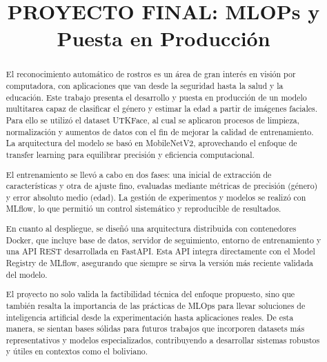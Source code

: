 \documentclass[sigplan,screen]{acmart}
\begin{document}
\begin{abstract}
El reconocimiento automático de rostros es un área de gran interés en visión por computadora, con aplicaciones
que van desde la seguridad hasta la salud y la educación. Este trabajo presenta el desarrollo y puesta en
producción de un modelo multitarea capaz de clasificar el género y estimar la edad a partir de imágenes
faciales. Para ello se utilizó el dataset UTKFace, al cual se aplicaron procesos de limpieza, normalización
y aumentos de datos con el fin de mejorar la calidad de entrenamiento. La arquitectura del modelo se basó en
MobileNetV2, aprovechando el enfoque de transfer learning para equilibrar precisión y eficiencia computacional.\newline

El entrenamiento se llevó a cabo en dos fases: una inicial de extracción de características y otra de ajuste
fino, evaluadas mediante métricas de precisión (género) y error absoluto medio (edad). La gestión de
experimentos y modelos se realizó con MLflow, lo que permitió un control sistemático y reproducible
de resultados.\newline

En cuanto al despliegue, se diseñó una arquitectura distribuida con contenedores Docker, que incluye base
de datos, servidor de seguimiento, entorno de entrenamiento y una API REST desarrollada en FastAPI. Esta
API integra directamente con el Model Registry de MLflow, asegurando que siempre se sirva la versión más
reciente validada del modelo.\newline

El proyecto no solo valida la factibilidad técnica del enfoque propuesto, sino que también resalta la
importancia de las prácticas de MLOps para llevar soluciones de inteligencia artificial desde la
experimentación hasta aplicaciones reales. De esta manera, se sientan bases sólidas para futuros trabajos
que incorporen datasets más representativos y modelos especializados, contribuyendo a desarrollar
sistemas robustos y útiles en contextos como el boliviano.
\end{abstract}

\title{PROYECTO FINAL: MLOPs y Puesta en Producción}

\end{document}

